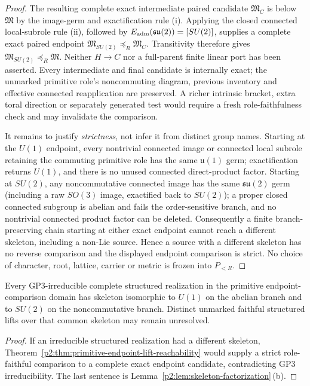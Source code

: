 \documentclass[12pt,a4paper]{article}
\begin{document}
\begin{proof}
The resulting complete exact intermediate paired candidate \(\mathfrak M_C\)
is below \(\mathfrak M\) by the image-germ and exactification rule (i).
Applying the closed connected local-subrole rule (ii), followed by
\(E_{\rm adm}(\mathfrak{su}(2))=[SU(2)]\), supplies a complete exact
paired endpoint \(\mathfrak M_{SU(2)}\preceq_R\mathfrak M_C\).
Transitivity therefore gives
\(\mathfrak M_{SU(2)}\preceq_R\mathfrak M\).
Neither \(H\to C\) nor a full-parent finite linear port has been
asserted.  Every intermediate and final candidate is internally exact;
the unmarked primitive role's noncommuting diagram, previous inventory
and effective connected reapplication are preserved.  A richer intrinsic
bracket, extra toral direction or separately generated test would require a
fresh role-faithfulness check and may invalidate the comparison.

It remains to justify \emph{strictness}, not infer it from distinct group
names.  Starting at the \(U(1)\) endpoint, every nontrivial connected
image or connected local subrole retaining the commuting primitive role has
the same \(\mathfrak u(1)\) germ; exactification returns \(U(1)\), and
there is no unused connected direct-product factor.  Starting at \(SU(2)\),
any noncommutative connected image has the same \(\mathfrak{su}(2)\) germ
(including a raw \(SO(3)\) image, exactified back to \(SU(2)\)); a proper
closed connected subgroup is abelian and fails the order-sensitive branch,
and no nontrivial connected product factor can be deleted.  Consequently a
finite branch-preserving chain starting at either exact endpoint cannot
reach a different skeleton, including a non-Lie source.  Hence a source
with a different skeleton has no reverse comparison and the displayed
endpoint comparison is strict.  No choice of character, root, lattice,
carrier or metric is frozen into \(P_{<R}\).
\end{proof}

\begin{corollary}
\label{p2:cor:primitive-irreducible-endpoint-skeleton}
Every GP3-irreducible complete structured realization in the primitive
endpoint-comparison domain has skeleton isomorphic to \(U(1)\) on the abelian
branch and to \(SU(2)\) on the noncommutative branch.  Distinct unmarked
faithful structured lifts over that common skeleton may remain unresolved.
\end{corollary}

\begin{proof}
If an irreducible structured realization had a different skeleton,
Theorem~\ref{p2:thm:primitive-endpoint-lift-reachability} would supply a strict
role-faithful comparison to a complete exact endpoint candidate, contradicting
GP3 irreducibility.  The last sentence is
Lemma~\ref{p2:lem:skeleton-factorization}\,(b).
\end{proof}
\end{document}
